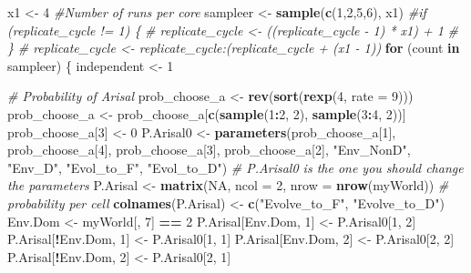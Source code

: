 \documentclass[]{book}
\newenvironment{Shaded}{\begin{snugshade}}{\end{snugshade}}
\newcommand{\KeywordTok}[1]{\textcolor[rgb]{0.13,0.29,0.53}{\textbf{{#1}}}}
\newcommand{\DataTypeTok}[1]{\textcolor[rgb]{0.13,0.29,0.53}{{#1}}}
\newcommand{\DecValTok}[1]{\textcolor[rgb]{0.00,0.00,0.81}{{#1}}}
\newcommand{\StringTok}[1]{\textcolor[rgb]{0.31,0.60,0.02}{{#1}}}
\newcommand{\CommentTok}[1]{\textcolor[rgb]{0.56,0.35,0.01}{\textit{{#1}}}}
\newcommand{\OtherTok}[1]{\textcolor[rgb]{0.56,0.35,0.01}{{#1}}}
\newcommand{\ControlFlowTok}[1]{\textcolor[rgb]{0.13,0.29,0.53}{\textbf{{#1}}}}
\newcommand{\OperatorTok}[1]{\textcolor[rgb]{0.81,0.36,0.00}{\textbf{{#1}}}}
\newcommand{\NormalTok}[1]{{#1}}
\theoremstyle{definition}
\theoremstyle{definition}
\theoremstyle{remark}
\begin{document}
\begin{Shaded}
\begin{Highlighting}[]
\NormalTok{  x1 <-}\StringTok{ }\DecValTok{4} \CommentTok{#Number of runs per core}
\NormalTok{  sampleer <-}\StringTok{ }\KeywordTok{sample}\NormalTok{(}\KeywordTok{c}\NormalTok{(}\DecValTok{1}\NormalTok{,}\DecValTok{2}\NormalTok{,}\DecValTok{5}\NormalTok{,}\DecValTok{6}\NormalTok{), x1)}
  \CommentTok{#if (replicate_cycle != 1) \{}
  \CommentTok{#  replicate_cycle <- ((replicate_cycle - 1) * x1) + 1}
 \CommentTok{# \}}
 \CommentTok{# replicate_cycle <- replicate_cycle:(replicate_cycle + (x1 - 1))}
  \ControlFlowTok{for}\NormalTok{ (count }\ControlFlowTok{in}\NormalTok{ sampleer) \{}
\NormalTok{  independent <-}\StringTok{ }\DecValTok{1} 

    
    \CommentTok{# Probability of Arisal}
\NormalTok{    prob_choose_a <-}\StringTok{ }\KeywordTok{rev}\NormalTok{(}\KeywordTok{sort}\NormalTok{(}\KeywordTok{rexp}\NormalTok{(}\DecValTok{4}\NormalTok{, }\DataTypeTok{rate =} \DecValTok{9}\NormalTok{)))}
\NormalTok{    prob_choose_a <-}\StringTok{ }\NormalTok{prob_choose_a[}\KeywordTok{c}\NormalTok{(}\KeywordTok{sample}\NormalTok{(}\DecValTok{1}\OperatorTok{:}\DecValTok{2}\NormalTok{, }\DecValTok{2}\NormalTok{), }\KeywordTok{sample}\NormalTok{(}\DecValTok{3}\OperatorTok{:}\DecValTok{4}\NormalTok{, }\DecValTok{2}\NormalTok{))]}
\NormalTok{    prob_choose_a[}\DecValTok{3}\NormalTok{] <-}\StringTok{ }\DecValTok{0}
\NormalTok{    P.Arisal0  <-}\StringTok{ }\KeywordTok{parameters}\NormalTok{(prob_choose_a[}\DecValTok{1}\NormalTok{], prob_choose_a[}\DecValTok{4}\NormalTok{],}
\NormalTok{                             prob_choose_a[}\DecValTok{3}\NormalTok{], prob_choose_a[}\DecValTok{2}\NormalTok{],}
                             \StringTok{"Env_NonD"}\NormalTok{, }\StringTok{"Env_D"}\NormalTok{,}
                             \StringTok{"Evol_to_F"}\NormalTok{, }\StringTok{"Evol_to_D"}\NormalTok{)}
    \CommentTok{# P.Arisal0 is the one you should change the parameters}
\NormalTok{    P.Arisal <-}\StringTok{ }\KeywordTok{matrix}\NormalTok{(}\OtherTok{NA}\NormalTok{, }\DataTypeTok{ncol =} \DecValTok{2}\NormalTok{, }\DataTypeTok{nrow =} \KeywordTok{nrow}\NormalTok{(myWorld)) }\CommentTok{# probability per cell}
    \KeywordTok{colnames}\NormalTok{(P.Arisal) <-}\StringTok{ }\KeywordTok{c}\NormalTok{(}\StringTok{"Evolve_to_F"}\NormalTok{, }\StringTok{"Evolve_to_D"}\NormalTok{)}
\NormalTok{    Env.Dom <-}\StringTok{ }\NormalTok{myWorld[, }\DecValTok{7}\NormalTok{] }\OperatorTok{==}\StringTok{ }\DecValTok{2}
\NormalTok{    P.Arisal[Env.Dom, }\DecValTok{1}\NormalTok{] <-}\StringTok{ }\NormalTok{P.Arisal0[}\DecValTok{1}\NormalTok{, }\DecValTok{2}\NormalTok{]}
\NormalTok{    P.Arisal[}\OperatorTok{!}\NormalTok{Env.Dom, }\DecValTok{1}\NormalTok{] <-}\StringTok{ }\NormalTok{P.Arisal0[}\DecValTok{1}\NormalTok{, }\DecValTok{1}\NormalTok{]}
\NormalTok{    P.Arisal[Env.Dom, }\DecValTok{2}\NormalTok{] <-}\StringTok{ }\NormalTok{P.Arisal0[}\DecValTok{2}\NormalTok{, }\DecValTok{2}\NormalTok{]}
\NormalTok{    P.Arisal[}\OperatorTok{!}\NormalTok{Env.Dom, }\DecValTok{2}\NormalTok{] <-}\StringTok{ }\NormalTok{P.Arisal0[}\DecValTok{2}\NormalTok{, }\DecValTok{1}\NormalTok{]}
    

\end{Highlighting}
\end{Shaded}
\end{document}
